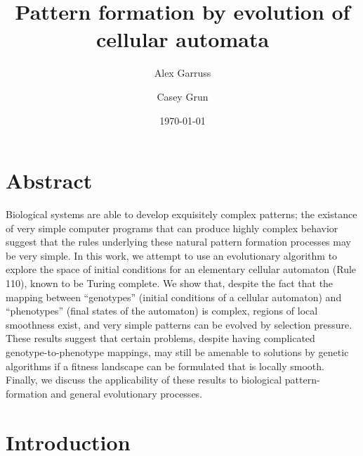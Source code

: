 \documentclass[twocolumn]{article}
\title{Pattern formation by evolution of cellular automata}
\author{Alex Garruss \and Casey Grun}
\date{\today}
\begin{document}
\maketitle

\section{Abstract}

Biological systems are able to develop exquisitely complex patterns; the existance of very simple computer programs that can produce highly complex behavior suggest that the rules underlying these natural pattern formation processes may be very simple. In this work, we attempt to use an evolutionary algorithm to explore the space of initial conditions for an elementary cellular automaton (Rule 110), known to be Turing complete. We show that, despite the fact that the mapping between ``genotypes'' (initial conditions of a cellular automaton) and ``phenotypes'' (final states of the automaton) is complex, regions of local smoothness exist, and very simple patterns can be evolved by selection pressure. These results suggest that certain problems, despite having complicated genotype-to-phenotype mappings, may still be amenable to solutions by genetic algorithms if a fitness landscape can be formulated that is locally smooth. Finally, we discuss the applicability of these results to biological pattern-formation and general evolutionary processes.

\section{Introduction}
\end{document}
